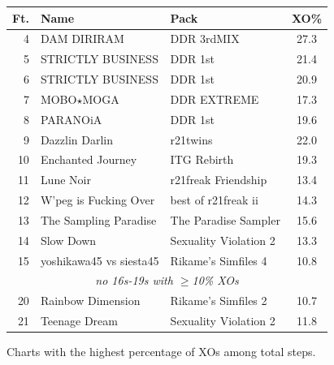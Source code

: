 \documentclass[10pt]{sigplanconf}
\begin{document}
\begin{figure}[t]
	\begin{center}
		\small
	\begin{tabular}{r|l|l|c}
		\bf Ft. & \bf Name & \bf Pack & \bf XO\% \\
		\hline
		 4 & DAM DIRIRAM              & DDR 3rdMIX            & 27.3 \\
		 5 & STRICTLY BUSINESS        & DDR 1st               & 21.4 \\
		 6 & STRICTLY BUSINESS        & DDR 1st               & 20.9 \\
		 7 & MOBO$\star$MOGA          & DDR EXTREME           & 17.3 \\
		 8 & PARANOiA                 & DDR 1st               & 19.6 \\
		 9 & Dazzlin Darlin           & r21twins              & 22.0 \\
		10 & Enchanted Journey        & ITG Rebirth           & 19.3 \\
		11 & Lune Noir                & r21freak Friendship   & 13.4 \\
		12 & W'peg is Fucking Over    & best of r21freak ii   & 14.3 \\
		13 & The Sampling Paradise    & The Paradise Sampler  & 15.6 \\
		14 & Slow Down                & Sexuality Violation 2 & 13.3 \\
		15 & yoshikawa45 vs siesta45  & Rikame's Simfiles 4   & 10.8 \\
		\multicolumn{4}{c}{\em no 16s-19s with $\ge$10\% XOs} \\
		20 & Rainbow Dimension        & Rikame's Simfiles 2   & 10.7 \\
		21 & Teenage Dream            & Sexuality Violation 2 & 11.8 \\
	\end{tabular}
	\end{center}
	\caption{Charts with the highest percentage of XOs among total steps.}
\end{figure}
\end{document}
